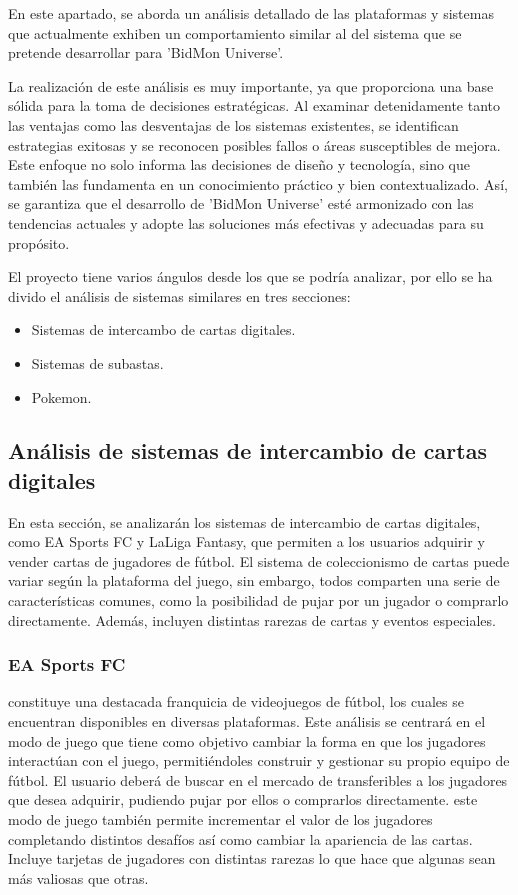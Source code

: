 
En este apartado, se aborda un análisis detallado de las plataformas y sistemas que actualmente exhiben un comportamiento similar al del sistema que se pretende desarrollar para 'BidMon Universe'. 

La realización de este análisis es muy importante, ya que proporciona una base sólida para la toma de decisiones estratégicas. Al examinar detenidamente tanto las ventajas como las desventajas de los sistemas existentes, se identifican estrategias exitosas y se reconocen posibles fallos 
o áreas susceptibles de mejora. Este enfoque no solo informa las decisiones de diseño y tecnología, sino que también las fundamenta en un conocimiento práctico y bien contextualizado. Así, se garantiza que el desarrollo de 'BidMon Universe' esté 
armonizado con las tendencias actuales y adopte las soluciones más efectivas y adecuadas para su propósito.

El proyecto tiene varios ángulos desde los que se podría analizar, por ello se ha divido el análisis de sistemas similares en tres secciones:
\begin{itemize}
    \item Sistemas de intercambo de cartas digitales.
    \item Sistemas de subastas.
    \item Pokemon.
\end{itemize}

\subsection{Análisis de sistemas de intercambio de cartas digitales}
En esta sección, se analizarán los sistemas de intercambio de cartas digitales, como EA Sports FC y LaLiga Fantasy, que permiten a los usuarios adquirir y vender cartas de jugadores de fútbol.
El sistema de coleccionismo de cartas puede variar según la plataforma del juego, sin embargo, todos comparten una serie de características comunes, como la posibilidad de pujar por un jugador o comprarlo directamente.
Además, incluyen distintas rarezas de cartas y eventos especiales.

\subsubsection{EA Sports FC}
 constituye una destacada franquicia de videojuegos de fútbol, los cuales se encuentran disponibles en diversas plataformas. 
Este análisis se centrará en el modo de juego  que tiene como objetivo cambiar la 
forma en que los jugadores interactúan con el juego, permitiéndoles construir y gestionar su propio equipo de fútbol.
El usuario deberá de buscar en el mercado de transferibles a los jugadores que desea adquirir, pudiendo pujar por ellos o comprarlos directamente.
este modo de juego también permite incrementar el valor de los jugadores completando distintos desafíos así como cambiar la apariencia de las cartas.
Incluye tarjetas de jugadores con distintas rarezas lo que hace que algunas sean más valiosas que otras.


